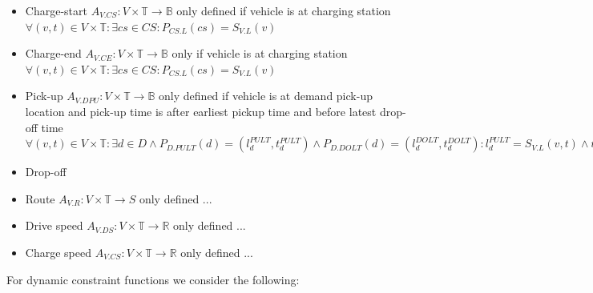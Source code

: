 \documentclass{IEEEtran}
\begin{document}
    \begin{itemize}
        \item Charge-start $A_{V.CS}: V \times \mathbb{T} \rightarrow \mathbb{B}$ only defined if vehicle is at charging station $\forall (v,t) \in V \times \mathbb{T}: \exists cs \in CS: P_{CS.L}(cs) = S_{V.L}(v)$
        \item Charge-end $A_{V.CE}: V \times \mathbb{T} \rightarrow \mathbb{B}$ only if vehicle is at charging station $\forall (v,t) \in V \times \mathbb{T}: \exists cs \in CS: P_{CS.L}(cs) = S_{V.L}(v)$
        \item Pick-up $A_{V.DPU}: V \times \mathbb{T} \rightarrow \mathbb{B}$ only defined if  vehicle is at demand pick-up location and pick-up time is after earliest pickup time and before latest drop-off time $\forall (v,t) \in V \times \mathbb{T}: \exists d \in D \wedge  P_{D.PULT}(d) = (l_d^{PULT},t_d^{PULT}) \wedge P_{D.DOLT}(d) = (l_d^{DOLT},t_d^{DOLT}): l_d^{PULT} = S_{V.L}(v,t) \wedge t_d^{PULT} \leq t \leq t_d^{DOLT}$
        \item Drop-off
        \item Route $A_{V.R}: V \times \mathbb{T} \rightarrow S$ only defined ...
        \item Drive speed $A_{V.DS}: V \times \mathbb{T} \rightarrow \mathbb{R}$ only defined ...
        \item Charge speed $A_{V.CS}: V \times \mathbb{T} \rightarrow \mathbb{R}$ only defined ...
    \end{itemize}
    For dynamic constraint functions we consider the following:
\end{document}
